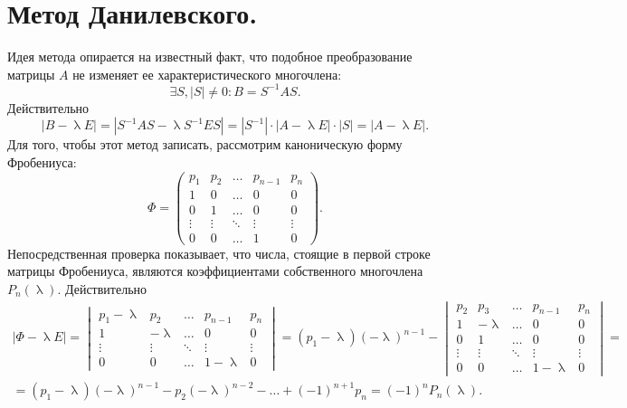 \documentclass[a4paper, 12pt]{report}
\renewcommand{\lambda}{\uplambda}
\begin{document}
	 \section{Метод Данилевского.}
	 Идея метода опирается на известный факт, что подобное преобразование матрицы $A$ не изменяет ее характеристического многочлена:
	 $$\exists S, |S| \ne0 : B=S^{-1}AS.$$
	 Действительно $$|B - \lambda E| = |S^{-1}AS - \lambda S^{-1}ES|=|S^{-1}|\cdot |A - \lambda E|\cdot |S| = |A-\lambda E|.$$
	 Для того, чтобы этот метод записать, рассмотрим каноническую форму Фробениуса:
	 $$\Phi = \begin{pmatrix}
	 	p_1 & p_2 & \ldots & p_{n-1} & p_n\\
	 	1 & 0 & \ldots & 0 & 0\\
	 	0 & 1 & \ldots & 0 & 0\\
	 	\vdots & \vdots & \ddots & \vdots & \vdots\\
	 	0 & 0 & \ldots & 1 & 0
	 \end{pmatrix}.$$
	 Непосредственная проверка показывает, что числа, стоящие в первой строке матрицы Фробениуса, являются коэффициентами собственного многочлена $P_n(\lambda)$. Действительно \begin{multline*}
	 	|\Phi - \lambda E| = \begin{vmatrix}
	 		p_1 - \lambda & p_2 & \ldots & p_{n-1} & p_n\\
	 		1 & - \lambda & \ldots& 0& 0\\
	 		\vdots & \vdots & \ddots & \vdots & \vdots\\
	 		0 & 0 & \ldots & 1 - \lambda & 0
	 	\end{vmatrix} = (p_1 - \lambda)(-\lambda)^{n-1} - \begin{vmatrix}
	 		p_2 & p_3 &\ldots& p_{n-1}& p_n\\
	 		1 & -\lambda & \ldots & 0 & 0\\
	 		0 & 1 & \ldots & 0& 0\\
	 		\vdots & \vdots & \ddots & \vdots & \vdots\\ 0& 0& \dots & 1-\lambda & 0
	 	\end{vmatrix} =\\= (p_1 - \lambda)(-\lambda)^{n-1} - p_2(-\lambda)^{n-2} - \ldots + (-1)^{n+1}p_n = (-1)^nP_n(\lambda).
	 \end{multline*}
\end{document}
